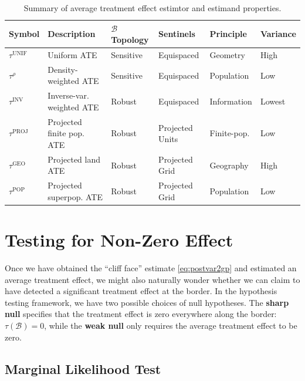 \documentclass[letter,12pt]{article}
\newcommand{\border}{\mathcal{B}}
\newcommand{\unifavg}{\tau^{\mathrm{UNIF}}}
\newcommand{\invvar}{\tau^{\mathrm{INV}}}
\newcommand{\taurho}{\tau^{\rho}}
\newcommand{\tauproj}{\tau^{\mathrm{PROJ}}}
\newcommand{\taugeo}{\tau^{\mathrm{GEO}}}
\newcommand{\taupop}{\tau^{\mathrm{POP}}}
\begin{document}
\begin{table}[tbp]
    \centering
    \begin{tabular}{llllll}
        \hline
        Symbol     & Description                     & $\border$ Topology & Sentinels       & Principle         & Variance \\
        \hline
        $\unifavg$ & Uniform ATE                     & Sensitive       & Equispaced      & Geometry    & High     \\
        $\taurho$  & Density-weighted ATE            & Sensitive       & Equispaced      & Population  & Low      \\
        $\invvar$  & Inverse-var. weighted ATE   & Robust          & Equispaced      & Information & Lowest   \\
        $\tauproj$ & Projected finite pop. ATE & Robust          & Projected Units & Finite-pop. & Low      \\
        $\taugeo$  & Projected land ATE              & Robust          & Projected Grid  & Geography   & High     \\
        $\taupop$  & Projected superpop. ATE   & Robust          & Projected Grid  & Population  & Low \\
        \hline
    \end{tabular}
    \caption{Summary of average treatment effect estimtor and estimand properties.}
    \label{table:estimator_properties}
\end{table}
\hypertarget{testing-for-non-zero-effect}{%
\section{Testing for Non-Zero Effect}\label{testing-for-non-zero-effect}}


\label{sec:hypothesis_testing}
Once we have obtained the ``cliff face'' estimate \eqref{eq:postvar2gp} and estimated an average treatment effect, we might also naturally wonder whether we can claim to have detected a significant treatment effect at the border.
In the hypothesis testing framework, we have two possible choices of null hypotheses.
The \textbf{sharp null} specifies that the treatment effect is zero everywhere along the border:
\(\tau(\border)=0\),
while the \textbf{weak null} only requires the average treatment effect to be zero.



\hypertarget{marginal-likelihood-test}{%
\subsection{Marginal Likelihood Test}\label{marginal-likelihood-test}}
\end{document}

